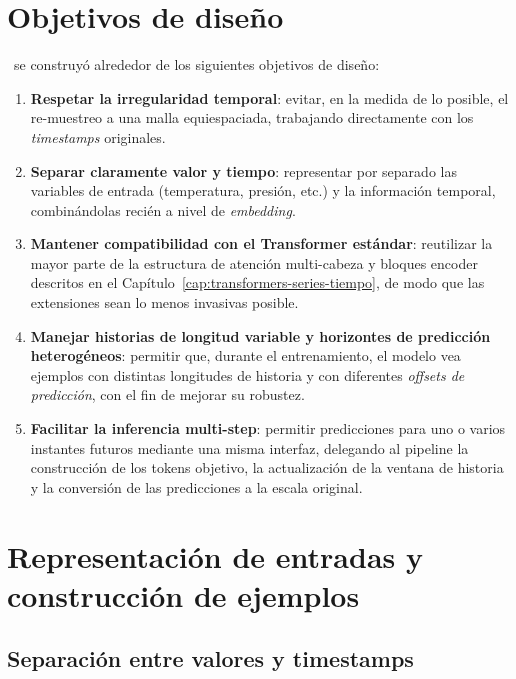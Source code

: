 \section{Objetivos de diseño}
\label{sec:objetivos-diseno-modelo}

\CTTransformer\ se construyó alrededor de los siguientes objetivos de diseño:

\begin{enumerate}
    \item \textbf{Respetar la irregularidad temporal}: evitar, en la medida de lo posible, el re-muestreo a una malla equiespaciada, trabajando directamente con los \emph{timestamps} originales.
    \item \textbf{Separar claramente valor y tiempo}: representar por separado las variables de entrada (temperatura, presión, etc.) y la información temporal, combinándolas recién a nivel de \emph{embedding}.
    \item \textbf{Mantener compatibilidad con el Transformer estándar}: reutilizar la mayor parte de la estructura de atención multi-cabeza y bloques encoder descritos en el Capítulo~\ref{cap:transformers-series-tiempo}, de modo que las extensiones sean lo menos invasivas posible.
    \item \textbf{Manejar historias de longitud variable y horizontes de predicción heterogéneos}: permitir que, durante el entrenamiento, el modelo vea ejemplos con distintas longitudes de historia y con diferentes \emph{offsets de predicción}, con el fin de mejorar su robustez.
    \item \textbf{Facilitar la inferencia multi-step}: permitir predicciones para uno o varios instantes futuros mediante una misma interfaz, delegando al pipeline la construcción de los tokens objetivo, la actualización de la ventana de historia y la conversión de las predicciones a la escala original.
\end{enumerate}

\section{Representación de entradas y construcción de ejemplos}
\label{sec:entradas-ejemplos}

\subsection{Separación entre valores y timestamps}

